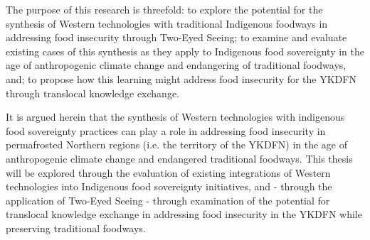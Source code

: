 \documentclass{report}
\begin{document}


\hspace{24pt} The purpose of this research is threefold:
to explore the potential for the synthesis of Western technologies with traditional Indigenous foodways in addressing food insecurity through Two-Eyed Seeing;
to examine and evaluate existing cases of this synthesis as they apply to Indigenous food sovereignty in the age of anthropogenic climate change and endangering of traditional foodways, and;
to propose how this learning might address food insecurity for the YKDFN through translocal knowledge exchange.

\hspace{24pt} It is argued herein that the synthesis of Western technologies with indigenous food sovereignty practices can play a role in addressing food insecurity in permafrosted Northern regions (i.e. the territory of the YKDFN) in the age of anthropogenic climate change and endangered traditional foodways. 
This thesis will be explored through the evaluation of existing integrations of Western technologies into Indigenous food sovereignty initiatives, and - through the application of Two-Eyed Seeing - through examination of the potential for translocal knowledge exchange in addressing food insecurity in the YKDFN while preserving traditional foodways.




\end{document}
